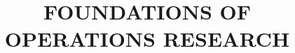 \documentclass[a4paper, 9pt]{article}
\title{FOUNDATIONS OF OPERATIONS RESEARCH}
\begin{document}
    \maketitle
    \tableofcontents{}
    \newpage
\end{document}
